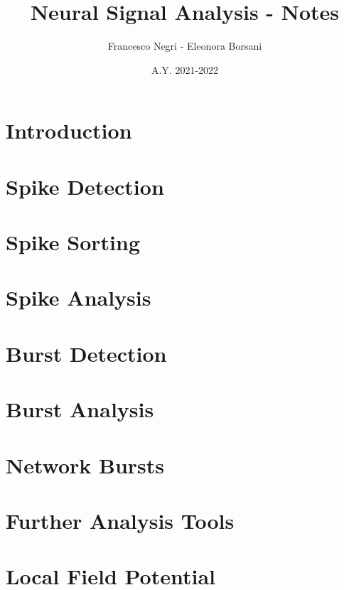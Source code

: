 \documentclass[12pt]{article}
\title{Neural Signal Analysis - Notes}
\author{Francesco Negri - Eleonora Borsani}
\date{A.Y. 2021-2022}
\begin{document}
\maketitle

\tableofcontents
\newpage

\section{Introduction}
\graphicspath{ {./images/1/} }

\newpage

\section{Spike Detection}
\graphicspath{ {./images/2/} }

\newpage

\section{Spike Sorting}
\graphicspath{ {./images/3/} }

\newpage

\section{Spike Analysis}
\graphicspath{ {./images/4/} }

\newpage

\section{Burst Detection}
\graphicspath{ {./images/5/} }

\newpage

\section{Burst Analysis}
\graphicspath{ {./images/6/} }

\newpage

\section{Network Bursts}
\graphicspath{ {./images/7/} }

\newpage

\section{Further Analysis Tools}
\graphicspath{ {./images/8/} }

\newpage

\section{Local Field Potential}
\graphicspath{ {./images/9/} }

\newpage
\end{document}
